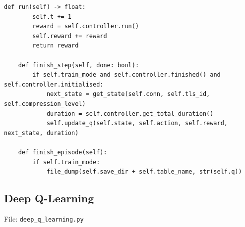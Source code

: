 \documentclass[a4paper]{report}
\begin{document}
\begin{lstlisting}[style=pythonstyle]
    def run(self) -> float:
        self.t += 1
        reward = self.controller.run()
        self.reward += reward
        return reward

    def finish_step(self, done: bool):
        if self.train_mode and self.controller.finished() and self.controller.initialised:
            next_state = get_state(self.conn, self.tls_id, self.compression_level)
            duration = self.controller.get_total_duration()
            self.update_q(self.state, self.action, self.reward, next_state, duration)

    def finish_episode(self):
        if self.train_mode:
            file_dump(self.save_dir + self.table_name, str(self.q))
\end{lstlisting}

\subsection{Deep Q-Learning}

File: \texttt{deep\_q\_learning.py}
\end{document}
